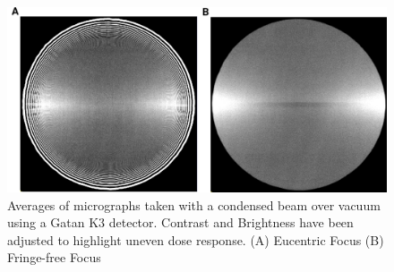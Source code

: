 \documentclass[
]{article}
\newenvironment{fignos:tagged-figure}[1][]{
    \let\oldthefigure\thefigure
    \let\oldtheHfigure\theHfigure
    \renewcommand{\thefigure}{#1}
    \renewcommand{\theHfigure}{#1}
  }{
    \let\thefigure\oldthefigure
    \let\theHfigure\oldtheHfigure
    \addtocounter{figure}{-1}
  }
\begin{document}
\begin{fignos:tagged-figure}

\begin{figure}
\hypertarget{fig:gain}{%
\centering
\includegraphics{figures/gain.png}
\caption{Averages of micrographs taken with a condensed beam over vacuum using a Gatan K3 detector. Contrast and Brightness have been adjusted to highlight uneven dose response. (A) Eucentric Focus (B) Fringe-free Focus}\label{fig:gain}
}
\end{figure}

\end{fignos:tagged-figure}
\end{document}
